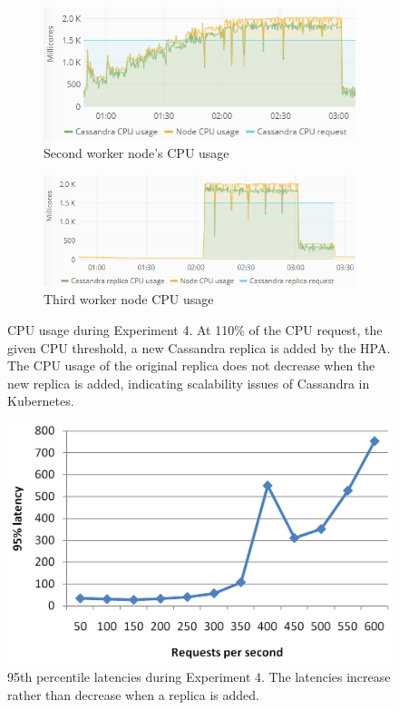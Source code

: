 \begin{figure}
\centering
\begin{subfigure}[b]{\columnwidth}
\centering
\includegraphics[width=0.70\columnwidth]{Images/Experiments/CPU/Grafana/cpu-cas-hpa-li-1.PNG}
\caption{Second worker node's CPU usage}
\label{fig:cpu-cas-hpa-li-1}
\end{subfigure}
\hfill
\begin{subfigure}[b]{\columnwidth}
\centering
\includegraphics[width=0.70\columnwidth]{Images/Experiments/CPU/Grafana/cpu-cas-hpa-li-2.PNG}
\caption{Third worker node CPU usage}
\label{fig:cpu-cas-hpa-li-2}
\end{subfigure}
\hfill
\vspace*{-7mm}
\caption{CPU usage during Experiment 4. At 110\% of the CPU request, the given CPU threshold, a new Cassandra replica is added by the HPA. The CPU usage of the original replica does not decrease when the new replica is added, indicating scalability issues of Cassandra in Kubernetes.}
\label{fig:cpu-cas-hpa-li}
\end{figure}

\begin{figure}
\centering
\includegraphics[width=0.55\columnwidth]{Images/Experiments/CPU/Latencies/lat-cas-hpa-li.PNG}
\caption{95th percentile latencies during Experiment 4. The latencies increase rather than decrease when a replica is added.}
\label{fig:lat-cas-hpa-li}
\end{figure}

